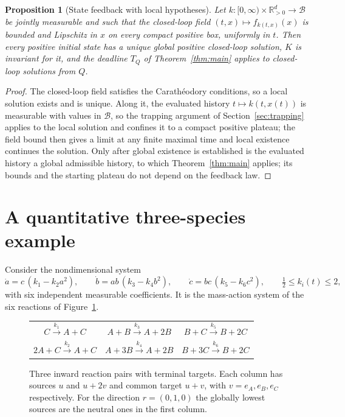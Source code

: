 \documentclass[11pt]{article}
\newtheorem{proposition}[theorem]{Proposition}
\theoremstyle{definition}
\theoremstyle{remark}
\newcommand{\R}{\mathbb R}
\newcommand{\U}{\R_{>0}^{d}}
\newcommand{\B}{\mathcal B}
\begin{document}
\begin{proposition}[State feedback with local hypotheses]\label{prop:feedback}
Let $k:[0,\infty)\times\U\to\B$ be jointly measurable and such that the closed-loop
field $(t,x)\mapsto f_{k(t,x)}(x)$ is bounded and Lipschitz in $x$ on every compact
positive box, uniformly in $t$. Then every positive initial state has a unique
global positive closed-loop solution, $K$ is invariant for it, and the deadline
$T_Q$ of Theorem~\ref{thm:main} applies to closed-loop solutions from $Q$.
\end{proposition}
\begin{proof}
The closed-loop field satisfies the Carath\'eodory conditions, so a local solution
exists and is unique. Along it, the evaluated history $t\mapsto k(t,x(t))$ is
measurable with values in $\B$, so the trapping argument of
Section~\ref{sec:trapping} applies to the local solution and confines it to a
compact positive plateau; the field bound then gives a limit at any finite
maximal time and local existence continues the solution. Only after global
existence is established is the evaluated history a global admissible history,
to which Theorem~\ref{thm:main} applies; its bounds and the starting plateau do not
depend on the feedback law.
\end{proof}

\section{A quantitative three-species example}\label{sec:example}

Consider the nondimensional system
\begin{equation}\label{eq:fixture}
 \dot a=c\,(k_1-k_2a^2),\qquad
 \dot b=ab\,(k_3-k_4b^2),\qquad
 \dot c=bc\,(k_5-k_6c^2),\qquad \tfrac12\le k_i(t)\le2,
\end{equation}
with six independent measurable coefficients. It is the mass-action system of the
six reactions of Figure~\ref{fig:network}.
\begin{figure}[ht]
\centering
\renewcommand{\arraystretch}{1.45}
\begin{tabular}{ccc}
$C\xrightarrow{k_1}A+C$ & $A+B\xrightarrow{k_3}A+2B$ & $B+C\xrightarrow{k_5}B+2C$\\
$2A+C\xrightarrow{k_2}A+C$ & $A+3B\xrightarrow{k_4}A+2B$ & $B+3C\xrightarrow{k_6}B+2C$
\end{tabular}
\caption{Three inward reaction pairs with terminal targets. Each column has
sources $u$ and $u+2v$ and common target $u+v$, with $v=e_A,e_B,e_C$
respectively. For the direction $r=(0,1,0)$ the globally lowest sources are the
neutral ones in the first column.}
\label{fig:network}
\end{figure}
\end{document}
